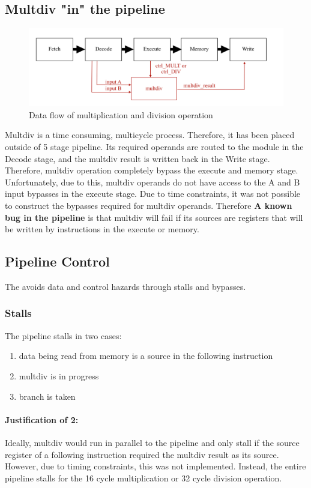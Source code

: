 \documentclass[letterpaper]{article}
\begin{document}
\subsection{Multdiv "in" the pipeline}
\begin{figure}[h]
    \centering
    \includegraphics[width=\textwidth]{multdiv.png}
    \caption{Data flow of multiplication and division operation}
    \label{fig:my_label}
\end{figure}
Multdiv is a time consuming, multicycle process. Therefore, it has been placed outside of 5 stage pipeline. Its required operands are routed to the module in the Decode stage, and the multdiv result is written back in the Write stage. Therefore, multdiv operation completely bypass the execute and memory stage. 
Unfortunately, due to this, multdiv operands do not have access to the A and B input bypasses in the execute stage. Due to time constraints, it was not possible to construct the bypasses required for multdiv operands. Therefore \textbf{A known bug in the pipeline} is that multdiv will fail if its sources are registers that will be written by instructions in the execute or memory. 

\subsection{Pipeline Control}
The avoids data and control hazards through stalls and bypasses. 
\subsubsection{Stalls}
The pipeline stalls in two cases:
\begin{enumerate}
    \item data being read from memory is a source in the following instruction
    \item multdiv is in progress
    \item branch is taken
\end{enumerate}
\paragraph{Justification of 2:} Ideally, multdiv would run in parallel to the pipeline and only stall if the source register of a following instruction required the multdiv result as its source. However, due to timing constraints, this was not implemented. Instead, the entire pipeline stalls for the 16 cycle multiplication or 32 cycle division operation.
\end{document}
